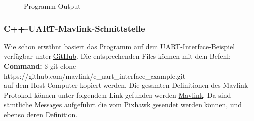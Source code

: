 \documentclass[12pt]{article} %
\begin{document}
		\begin{figure}[H]
			\centering
			\caption{Programm Output}
			\label{2}
		\end{figure}
	
	\subsubsection{C++-UART-Mavlink-Schnittstelle}
	
	Wie schon erwähnt basiert das Programm auf dem UART-Interface-Beispiel verfügbar unter \href{https://github.com/mavlink/c_uart_interface_example}{GitHub}. Die entsprechenden Files können mit dem Befehl:
	\\[0.2cm]
	\noindent\hspace*{15mm} \textbf{Command:} \$ git clone https://github.com/mavlink/c\_uart\_interface\_example.git\\[0.2cm]
	\noindent
	auf dem Host-Computer kopiert werden. Die gesamten Definitionen des Mavlink-Protokoll können unter folgendem Link gefunden werden \href{https://pixhawk.ethz.ch/mavlink/}{Mavlink}. Da sind sämtliche Messages aufgeführt die vom Pixhawk gesendet werden können, und ebenso deren Definition.
\end{document}
